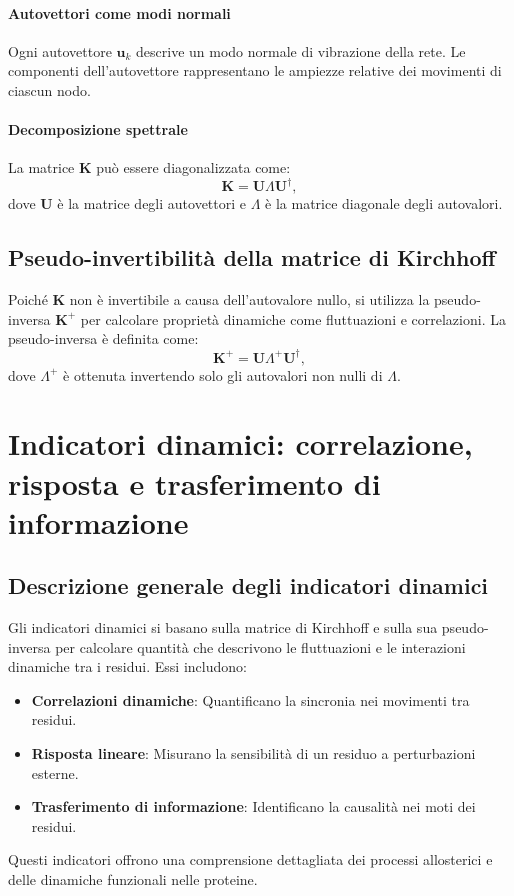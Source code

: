 \documentclass[Lau,binding=0.6cm,oneside,noexaminfo]{sapthesis}
\begin{document}
\paragraph{Autovettori come modi normali}
Ogni autovettore $\mathbf{u}_k$ descrive un modo normale di vibrazione della rete. Le componenti dell’autovettore rappresentano le ampiezze relative dei movimenti di ciascun nodo.

\paragraph{Decomposizione spettrale}
La matrice $\mathbf{K}$ può essere diagonalizzata come:
\begin{equation}
\mathbf{K} = \mathbf{U} \Lambda \mathbf{U}^\dagger,
\end{equation}
dove $\mathbf{U}$ è la matrice degli autovettori e $\Lambda$ è la matrice diagonale degli autovalori.

\subsection{Pseudo-invertibilità della matrice di Kirchhoff}

Poiché $\mathbf{K}$ non è invertibile a causa dell'autovalore nullo, si utilizza la pseudo-inversa $\mathbf{K}^+$ per calcolare proprietà dinamiche come fluttuazioni e correlazioni. La pseudo-inversa è definita come:
\begin{equation}
\mathbf{K}^+ = \mathbf{U} \Lambda^+ \mathbf{U}^\dagger,
\end{equation}
dove $\Lambda^+$ è ottenuta invertendo solo gli autovalori non nulli di $\Lambda$.

\section{Indicatori dinamici: correlazione, risposta e trasferimento di informazione}

\subsection{Descrizione generale degli indicatori dinamici}

Gli indicatori dinamici si basano sulla matrice di Kirchhoff e sulla sua pseudo-inversa per calcolare quantità che descrivono le fluttuazioni e le interazioni dinamiche tra i residui. Essi includono:
\begin{itemize}
    \item \textbf{Correlazioni dinamiche}: Quantificano la sincronia nei movimenti tra residui.
    \item \textbf{Risposta lineare}: Misurano la sensibilità di un residuo a perturbazioni esterne.
    \item \textbf{Trasferimento di informazione}: Identificano la causalità nei moti dei residui.
\end{itemize}
Questi indicatori offrono una comprensione dettagliata dei processi allosterici e delle dinamiche funzionali nelle proteine.
\end{document}

